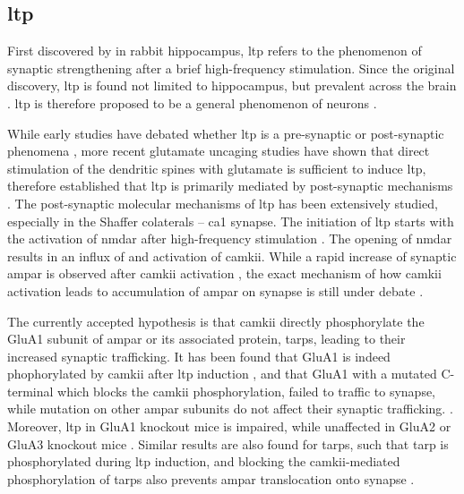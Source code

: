 \subsection{\gls{ltp}}

First discovered by \citet{bliss73} in rabbit hippocampus, \gls{ltp} refers to the phenomenon of synaptic strengthening after a brief high-frequency stimulation. Since the original discovery, \gls{ltp} is found not limited to hippocampus, but prevalent across the brain \citep[e.g.][]{clugnet90}. \gls{ltp} is therefore proposed to be a general phenomenon of neurons \citep{malenka04}. 

While early studies have debated whether \gls{ltp} is a pre-synaptic or post-synaptic phenomena \citep{malinow90, bekkers90, isaac95, liao95}, more recent glutamate uncaging studies have shown that direct stimulation of the dendritic spines with glutamate is sufficient to induce \gls{ltp}, therefore established that \gls{ltp} is primarily mediated by post-synaptic mechanisms \citep{kerchner08}. The post-synaptic molecular mechanisms of \gls{ltp} has been extensively studied, especially in the Shaffer colaterals -- \gls{ca1} synapse. The initiation of \gls{ltp} starts with the activation of \gls{nmdar} after high-frequency stimulation \citep{collingridge83}. The opening of \gls{nmdar} results in an influx of  and activation of \gls{camkii}. While a rapid increase of synaptic \gls{ampar} is observed after \gls{camkii} activation \citep{patterson10}, the exact mechanism of how \gls{camkii} activation leads to accumulation of \gls{ampar} on synapse is still under debate \citep{herring16}. 

The currently accepted hypothesis is that \gls{camkii} directly phosphorylate the GluA1 subunit of \gls{ampar} or its associated protein, \glspl{tarp}, leading to their increased synaptic trafficking. It has been found that GluA1 is indeed phophorylated by \gls{camkii} after \gls{ltp} induction \citep{mcglade-mcculloh93, barria97, lee03}, and that GluA1 with a mutated C-terminal which blocks the \gls{camkii} phosphorylation, failed to traffic to synapse, while mutation on other \gls{ampar} subunits do not affect their synaptic trafficking. \citep{hayashi00, shi01}. Moreover, \gls{ltp} in GluA1 knockout mice is impaired, while unaffected in GluA2 or GluA3 knockout mice \citep{zamanillo99, meng03}. Similar results are also found for \glspl{tarp}, such that \gls{tarp} is phosphorylated during \gls{ltp} induction, and blocking the \gls{camkii}-mediated phosphorylation of \glspl{tarp} also prevents \gls{ampar} translocation onto synapse \citep{tomita05, sumioka10}.

